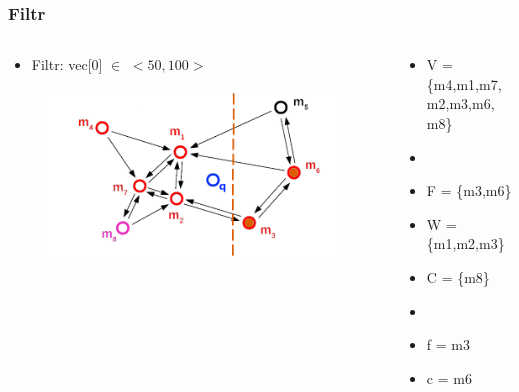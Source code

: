 \documentclass{beamer}
\begin{document}
	\begin{frame}
		\frametitle{Filtr}
		\begin{columns}[T] %
			\begin{column}{.6\textwidth}
				\begin{itemize}
					\item[] Filtr: vec[0] $\in$ $<50,100>$
				\end{itemize}
				\begin{figure}
					\includegraphics[scale=0.3]{figures/Filtry_b4.png}
				\end{figure}
			\end{column}%
			\hfill%
			\begin{column}{.4\textwidth}
				\begin{itemize}
					\item V = \{m4,m1,m7,m2,m3,m6, m8\}
					\item[]
					\item F = \{m3,m6\}
					\item W = \{m1,m2,m3\}
					\item C = \{m8\}
					\item[]
					\item f = m3
					\item c = m6
				\end{itemize}
			\end{column}%
		\end{columns}
	\end{frame}
\end{document}
